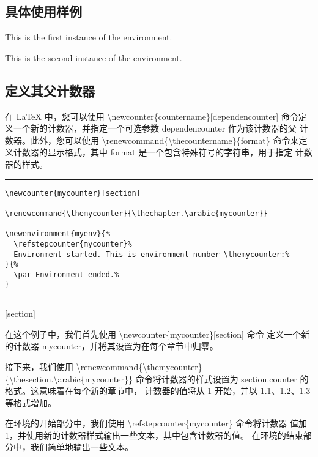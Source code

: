 \documentclass[12pt]{article}
\newcommand{\m}{\textbackslash}
\newcommand{\hl}{\noindent\rule{1\linewidth}{.1em}}
\begin{document}
\subsection{具体使用样例}
\begin{myenv}
  This is the first instance of the environment.
\end{myenv}

\begin{myenv}
  This is the second instance of the environment.
\end{myenv}


\subsection{定义其父计数器}
在 LaTeX 中，您可以使用 \m newcounter\{countername\}[dependencounter] 
命令定义一个新的计数器，并指定一个可选参数 dependencounter 作为该计数器的父
计数器。此外，您可以使用 \m renewcommand\{\m thecountername\}\{format\} 
命令来定义计数器的显示格式，其中 format 是一个包含特殊符号的字符串，用于指定
计数器的样式。

\hl
\begin{verbatim}
\newcounter{mycounter}[section]

\renewcommand{\themycounter}{\thechapter.\arabic{mycounter}}

\newenvironment{myenv}{%
  \refstepcounter{mycounter}%
  Environment started. This is environment number \themycounter:%
}{%
  \par Environment ended.%
}   
\end{verbatim}
\hl

[section]

\renewcommand{\themycounter}{\thesection.\arabic{mycounter}}

\newenvironment{themyenv}{%
  \refstepcounter{mycounter}%
  Environment started. This is environment number \themycounter:%
}{%
  \par Environment ended.%
}

在这个例子中，我们首先使用 \m newcounter\{mycounter\}[section] 命令
定义一个新的计数器 mycounter，并将其设置为在每个章节中归零。

接下来，我们使用 \m renewcommand\{\m themycounter\}\{\m thesection.\m arabic\{mycounter\}\} 
命令将计数器的样式设置为 section.counter 的格式。这意味着在每个新的章节中，
计数器的值将从 1 开始，并以 1.1、1.2、1.3 等格式增加。

在环境的开始部分中，我们使用 \m refstepcounter\{mycounter\} 命令将计数器
值加 1，并使用新的计数器样式输出一些文本，其中包含计数器的值。
在环境的结束部分中，我们简单地输出一些文本。
\end{document}
